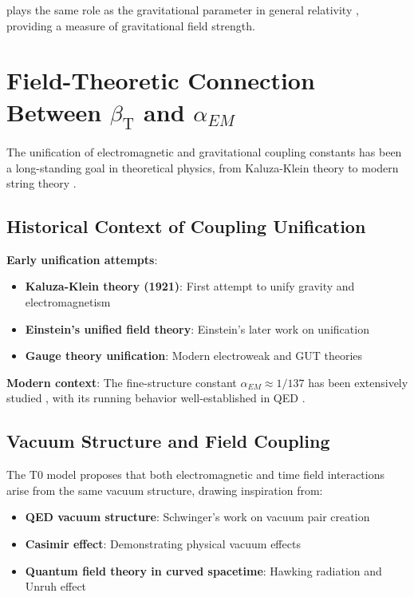 \documentclass[12pt,a4paper]{article}
\newcommand{\betaT}{\beta_{\text{T}}}
\begin{document}
	plays the same role as the gravitational parameter in general relativity \citep{weinberg1972}, providing a measure of gravitational field strength.
	
	\section{Field-Theoretic Connection Between $\betaT$ and $\alpha_{EM}$}
	\label{sec:beta_alpha_connection}
	
	The unification of electromagnetic and gravitational coupling constants has been a long-standing goal in theoretical physics, from Kaluza-Klein theory \citep{kaluza1921,klein1926} to modern string theory \citep{green1987,polchinski1998}.
	
	\subsection{Historical Context of Coupling Unification}
	\label{subsec:coupling_unification_history}
	
	\textbf{Early unification attempts}:
	\begin{itemize}
		\item \textbf{Kaluza-Klein theory (1921)}: First attempt to unify gravity and electromagnetism \citep{kaluza1921,klein1926}
		\item \textbf{Einstein's unified field theory}: Einstein's later work on unification \citep{einstein1955}
		\item \textbf{Gauge theory unification}: Modern electroweak \citep{weinberg1967,salam1968} and GUT theories \citep{georgi1974}
	\end{itemize}
	
	\textbf{Modern context}:
	The fine-structure constant $\alpha_{EM} \approx 1/137$ has been extensively studied \citep{sommerfeld1916,feynman1985}, with its running behavior well-established in QED \citep{peskin1995}.
	
	\subsection{Vacuum Structure and Field Coupling}
	\label{subsec:vacuum_structure}
	
	The T0 model proposes that both electromagnetic and time field interactions arise from the same vacuum structure, drawing inspiration from:
	\begin{itemize}
		\item \textbf{QED vacuum structure}: Schwinger's work on vacuum pair creation \citep{schwinger1951}
		\item \textbf{Casimir effect}: Demonstrating physical vacuum effects \citep{casimir1948}
		\item \textbf{Quantum field theory in curved spacetime}: Hawking radiation \citep{hawking1975} and Unruh effect \citep{unruh1976}
	\end{itemize}
	
\end{document}
